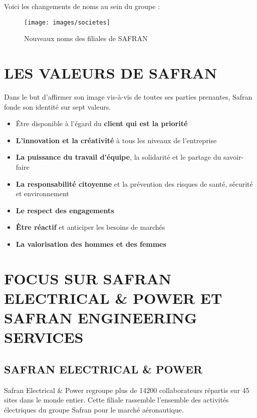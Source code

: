 Voici les changements de noms au sein du groupe :

\begin{figure}[!h]
\begin{center}
\texttt{[image: images/societes]}
\end{center}
\caption{Nouveaux noms des filiales de SAFRAN}
\end{figure}


\section{LES VALEURS DE SAFRAN}

Dans le but d’affirmer son image vis-à-vis de toutes ses parties prenantes, Safran fonde son identité sur sept valeurs.

\begin{itemize}
\item Être disponible à l’égard du \textbf{client qui est la priorité}
\item \textbf{L’innovation et la créativité} à tous les niveaux de l’entreprise
\item \textbf{La puissance du travail d’équipe}, la solidarité et le partage du savoir-faire
\item \textbf{La responsabilité citoyenne} et la prévention des risques de santé, sécurité et environnement
\item \textbf{Le respect des engagements}
\item \textbf{Être réactif} et anticiper les besoins de marchés
\item \textbf{La valorisation des hommes et des femmes}
\end{itemize}

\section{FOCUS SUR SAFRAN ELECTRICAL \& POWER ET SAFRAN ENGINEERING SERVICES}
\subsection{ SAFRAN ELECTRICAL \& POWER }

Safran Electrical \& Power regroupe plus de 14200 collaborateurs répartis sur 45 sites dans le monde entier. Cette filiale rassemble l’ensemble des activités électriques du groupe Safran pour le marché aéronautique.\\

